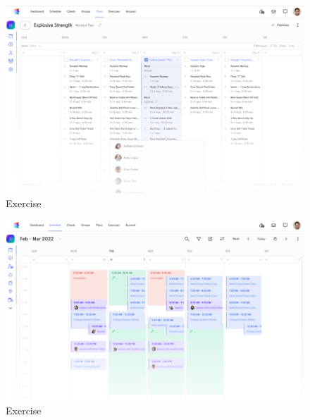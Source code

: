               \begin{figure}[H]
                      \includegraphics[scale=0.5]{./Slike/trainer_workouts.png}
                      \centering
                      \caption{Exercise}
                      \label{fig:promjene}
                \end{figure}

                \begin{figure}[H]
                      \includegraphics[scale=0.5]{./Slike/trainer_schedule.png}
                      \centering
                      \caption{Exercise}
                      \label{fig:promjene}
                \end{figure}

